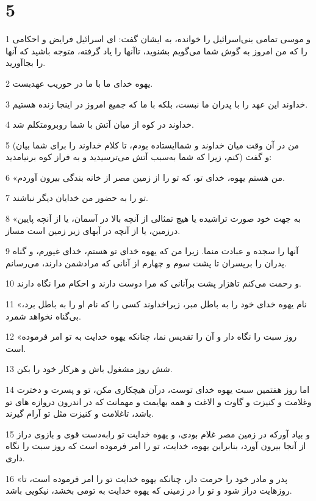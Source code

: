 \chapter{5}

\par 1 و موسی تمامی بنی‌اسرائیل را خوانده، به ایشان گفت: ای اسرائیل فرایض و احکامی را که من امروز به گوش شما می‌گویم بشنوید، تاآنها را یاد گرفته، متوجه باشید که آنها را بجاآورید.
\par 2 یهوه خدای ما با ما در حوریب عهدبست.
\par 3 خداوند این عهد را با پدران ما نبست، بلکه با ما که جمیع امروز در اینجا زنده هستیم.
\par 4 خداوند در کوه از میان آتش با شما روبرومتکلم شد.
\par 5 (من در آن وقت میان خداوند و شماایستاده بودم، تا کلام خداوند را برای شما بیان کنم، زیرا که شما به‌سبب آتش می‌ترسیدید و به فراز کوه برنیامدید) و گفت:
\par 6 «من هستم یهوه، خدای تو، که تو را از زمین مصر از خانه بندگی بیرون آوردم.
\par 7 تو را به حضور من خدایان دیگر نباشند.
\par 8 «به جهت خود صورت تراشیده یا هیچ تمثالی از آنچه بالا در آسمان، یا از آنچه پایین درزمین، یا از آنچه در آبهای زیر زمین است مساز.
\par 9 آنها را سجده و عبادت منما. زیرا من که یهوه خدای تو هستم، خدای غیورم، و گناه پدران را برپسران تا پشت سوم و چهارم از آنانی که مرادشمن دارند، می‌رسانم.
\par 10 و رحمت می‌کنم تاهزار پشت برآنانی که مرا دوست دارند و احکام مرا نگاه دارند.
\par 11 «نام یهوه خدای خود را به باطل مبر، زیراخداوند کسی را که نام او را به باطل برد، بی‌گناه نخواهد شمرد.
\par 12 «روز سبت را نگاه دار و آن را تقدیس نما، چنانکه یهوه خدایت به تو امر فرموده است.
\par 13 شش روز مشغول باش و هرکار خود را بکن.
\par 14 اما روز هفتمین سبت یهوه خدای توست، درآن هیچکاری مکن، تو و پسرت و دخترت وغلامت و کنیزت و گاوت و الاغت و همه بهایمت و مهمانت که در اندرون دروازه های تو باشد، تاغلامت و کنیزت مثل تو آرام گیرند.
\par 15 و بیاد آورکه در زمین مصر غلام بودی، و یهوه خدایت تو رابه‌دست قوی و بازوی دراز از آنجا بیرون آورد، بنابراین یهوه، خدایت، تو را امر فرموده است که روز سبت را نگاه داری.
\par 16 «پدر و مادر خود را حرمت دار، چنانکه یهوه خدایت تو را امر فرموده است، تا روزهایت دراز شود و تو را در زمینی که یهوه خدایت به تومی بخشد، نیکویی باشد.
